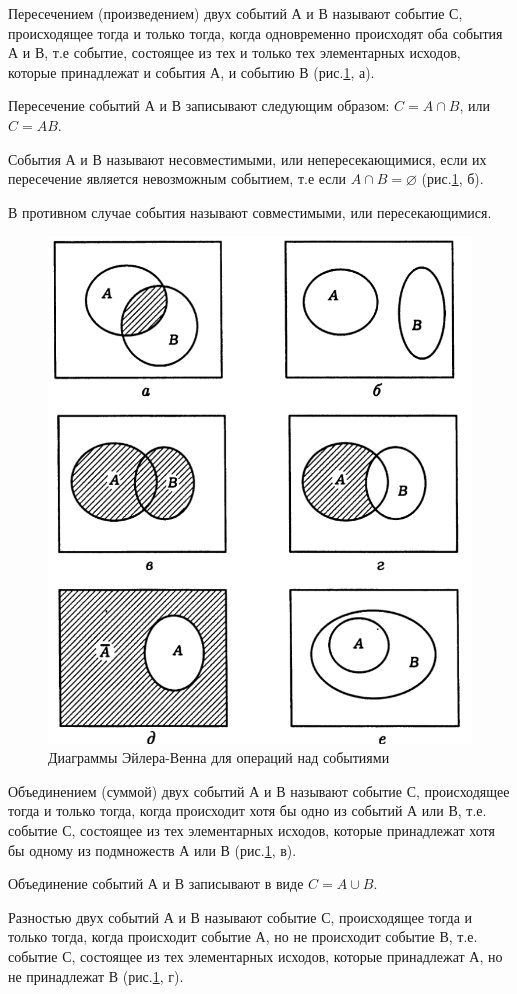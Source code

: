 \documentclass{book}
\begin{document}
Пересечением (произведением) двух событий А и В называют событие С, происходящее тогда и только тогда, когда одновременно происходят оба события А и В, т.е событие, состоящее из тех и только тех элементарных исходов, которые принадлежат и события А, и событию В (рис.\ref{fig:2}, а).

Пересечение событий А и В записывают следующим образом: $C=A\cap B$, или $C=AB$.

События А и В называют несовместимыми, или непересекающимися, если их пересечение является невозможным событием, т.е если $A\cap B=\varnothing$ (рис.\ref{fig:2}, б).

В противном случае события называют совместимыми, или пересекающимися.

\begin{figure}[h!]
  \centering
  \includegraphics[width=.7\textwidth]{./pictures/2.png}
  \caption{Диаграммы Эйлера-Венна для операций над событиями}
  \label{fig:2}
\end{figure}

Объединением (суммой) двух событий А и В называют событие С, происходящее тогда и только тогда, когда происходит хотя бы одно из событий А или В, т.е. событие С, состоящее из тех элементарных исходов, которые принадлежат хотя бы одному из подмножеств А или В (рис.\ref{fig:2}, в).

Объединение событий А и В записывают в виде $C=A\cup B$.

Разностью двух событий А и В называют событие С, происходящее тогда и только тогда, когда происходит событие А, но не происходит событие В, т.е. событие С, состоящее из тех элементарных исходов, которые принадлежат А, но не принадлежат В (рис.\ref{fig:2}, г).
\end{document}
